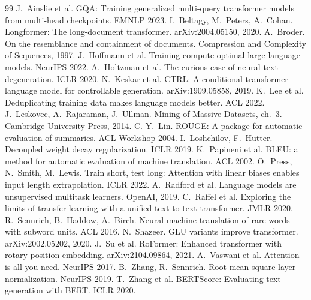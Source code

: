 \documentclass[11pt,a4paper]{article}
\begin{document}
\begin{thebibliography}{99}\small
{} J.~Ainslie et al. GQA: Training generalized multi-query transformer models from multi-head checkpoints. EMNLP 2023.
 I.~Beltagy, M.~Peters, A.~Cohan. Longformer: The long-document transformer. arXiv:2004.05150, 2020.
 A.~Broder. On the resemblance and containment of documents. Compression and Complexity of Sequences, 1997.
 J.~Hoffmann et al. Training compute-optimal large language models. NeurIPS 2022.
 A.~Holtzman et al. The curious case of neural text degeneration. ICLR 2020.
 N.~Keskar et al. CTRL: A conditional transformer language model for controllable generation. arXiv:1909.05858, 2019.
 K.~Lee et al. Deduplicating training data makes language models better. ACL 2022.
 J.~Leskovec, A.~Rajaraman, J.~Ullman. Mining of Massive Datasets, ch.~3. Cambridge University Press, 2014.
 C.-Y.~Lin. ROUGE: A package for automatic evaluation of summaries. ACL Workshop 2004.
 I.~Loshchilov, F.~Hutter. Decoupled weight decay regularization. ICLR 2019.
 K.~Papineni et al. BLEU: a method for automatic evaluation of machine translation. ACL 2002.
 O.~Press, N.~Smith, M.~Lewis. Train short, test long: Attention with linear biases enables input length extrapolation. ICLR 2022.
 A.~Radford et al. Language models are unsupervised multitask learners. OpenAI, 2019.
 C.~Raffel et al. Exploring the limits of transfer learning with a unified text-to-text transformer. JMLR 2020.
 R.~Sennrich, B.~Haddow, A.~Birch. Neural machine translation of rare words with subword units. ACL 2016.
 N.~Shazeer. GLU variants improve transformer. arXiv:2002.05202, 2020.
 J.~Su et al. RoFormer: Enhanced transformer with rotary position embedding. arXiv:2104.09864, 2021.
 A.~Vaswani et al. Attention is all you need. NeurIPS 2017.
 B.~Zhang, R.~Sennrich. Root mean square layer normalization. NeurIPS 2019.
 T.~Zhang et al. BERTScore: Evaluating text generation with BERT. ICLR 2020.
\end{thebibliography}
\end{document}
